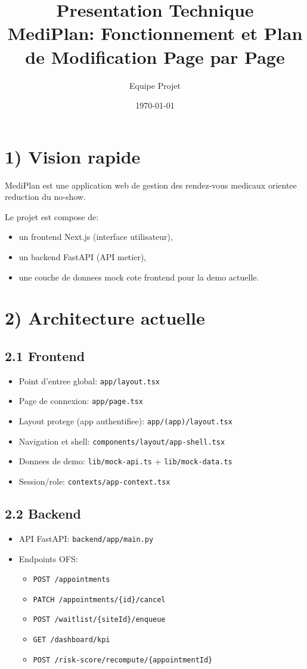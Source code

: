 \documentclass[11pt,a4paper]{article}
\title{Presentation Technique\\MediPlan: Fonctionnement et Plan de Modification Page par Page}
\author{Equipe Projet}
\date{\today}
\begin{document}
\maketitle

\section*{1) Vision rapide}
MediPlan est une application web de gestion des rendez-vous medicaux orientee reduction du no-show.

Le projet est compose de:
\begin{itemize}[leftmargin=*]
  \item un frontend Next.js (interface utilisateur),
  \item un backend FastAPI (API metier),
  \item une couche de donnees mock cote frontend pour la demo actuelle.
\end{itemize}

\section*{2) Architecture actuelle}

\subsection*{2.1 Frontend}
\begin{itemize}[leftmargin=*]
  \item Point d'entree global: \texttt{app/layout.tsx}
  \item Page de connexion: \texttt{app/page.tsx}
  \item Layout protege (app authentifiee): \texttt{app/(app)/layout.tsx}
  \item Navigation et shell: \texttt{components/layout/app-shell.tsx}
  \item Donnees de demo: \texttt{lib/mock-api.ts} + \texttt{lib/mock-data.ts}
  \item Session/role: \texttt{contexts/app-context.tsx}
\end{itemize}

\subsection*{2.2 Backend}
\begin{itemize}[leftmargin=*]
  \item API FastAPI: \texttt{backend/app/main.py}
  \item Endpoints OFS:
  \begin{itemize}
    \item \texttt{POST /appointments}
    \item \texttt{PATCH /appointments/\{id\}/cancel}
    \item \texttt{POST /waitlist/\{siteId\}/enqueue}
    \item \texttt{GET /dashboard/kpi}
    \item \texttt{POST /risk-score/recompute/\{appointmentId\}}
  \end{itemize}
\end{itemize}
\end{document}

